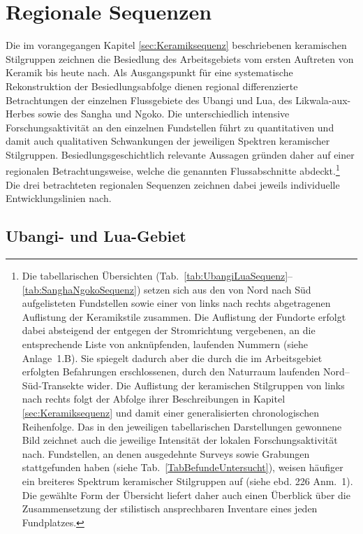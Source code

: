 \section{Regionale Sequenzen}\label{sec:Sequenzen}

Die im vorangegangen Kapitel \ref{sec:Keramiksequenz} beschriebenen keramischen Stilgruppen zeichnen die Besiedlung des Arbeitsgebiets vom ersten Auftreten von Keramik bis heute nach. Als Ausgangspunkt für eine systematische Rekonstruktion der Besiedlungsabfolge dienen regional differenzierte Betrachtungen der einzelnen Flussgebiete des \mbox{Ubangi} und Lua, des \mbox{Likwala}-\mbox{aux}-\mbox{Herbes} sowie des \mbox{Sangha} und \mbox{Ngoko}. Die unterschiedlich intensive Forschungsaktivität an den einzelnen Fundstellen führt zu quantitativen und damit auch qualitativen Schwankungen der jeweiligen Spektren keramischer Stilgruppen. Besiedlungsgeschichtlich relevante Aussagen gründen daher auf einer regionalen Betrachtungsweise, welche die genannten Flussabschnitte abdeckt.\footnote{Die tabellarischen Übersichten (Tab.~\ref{tab:UbangiLuaSequenz}--\ref{tab:SanghaNgokoSequenz}) setzen sich aus den von Nord nach Süd aufgelisteten Fundstellen sowie einer von links nach rechts abgetragenen Auflistung der Keramikstile zusammen. Die Auflistung der Fundorte erfolgt dabei absteigend der entgegen der Stromrichtung vergebenen, an die entsprechende Liste von \textcite[542\,f. Karte~1]{Wotzka.1995} anknüpfenden, laufenden Nummern (siehe Anlage~1.B). Sie spiegelt dadurch aber die durch die im Arbeitsgebiet erfolgten Befahrungen erschlossenen, durch den Naturraum laufenden Nord--Süd-Transekte wider. Die Auflistung der keramischen Stilgruppen von links nach rechts folgt der Abfolge ihrer Beschreibungen in Kapitel \ref{sec:Keramiksequenz} und damit einer generalisierten chronologischen Reihenfolge. Das in den jeweiligen tabellarischen Darstellungen gewonnene Bild zeichnet auch die jeweilige Intensität der lokalen Forschungsaktivität nach. Fundstellen, an denen ausgedehnte Surveys sowie Grabungen stattgefunden haben (siehe Tab.~\ref{TabBefundeUntersucht}), weisen häufiger ein breiteres Spektrum keramischer Stilgruppen auf (siehe ebd. 226 Anm.~1). Die gewählte Form der Übersicht liefert daher auch einen Überblick über die Zusammensetzung der stilistisch ansprechbaren Inventare eines jeden Fundplatzes.} Die drei betrachteten regionalen Sequenzen zeichnen dabei jeweils individuelle Entwicklungslinien nach.


\subsection{\mbox{Ubangi}- und Lua-Gebiet}\label{sec:SequenzUbangiLua}

